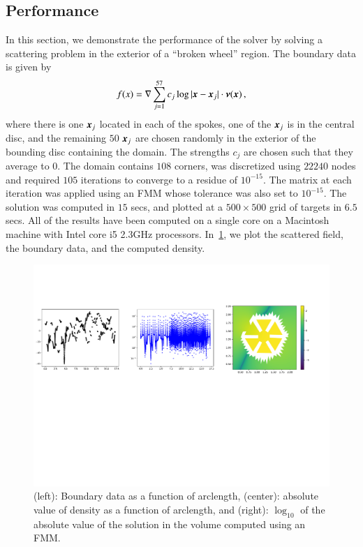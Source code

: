 \subsection{Performance}
In this section, we demonstrate the performance of the solver by solving a scattering problem in the
exterior of a ``broken wheel'' region. The boundary data is given by
\begin{equation}
f(x) = \nabla  \sum_{j=1}^{57} c_{j} \log| \boldsymbol{x} - \boldsymbol{x}_{j}| \cdot \boldsymbol{\nu}(\boldsymbol{x}) \, , 
\end{equation}
where there is one $\boldsymbol{x}_{j}$ located in each of the spokes, one of the $\boldsymbol{x}_{j}$ is in the central disc, and the remaining $50$ $\boldsymbol{x}_{j}$ are chosen randomly in the exterior of the bounding disc containing the domain. The strengths $c_{j}$ are chosen such that they average to $0$. The domain contains $108$ corners, was discretized using $22240$ nodes and required $105$ iterations  to converge to a residue of $10^{-15}$. The matrix at each iteration was applied using an FMM whose tolerance was also set to $10^{-15}$. The solution was computed in $15$ secs, and plotted at a $500\times 500$ grid of targets in $6.5$ secs. All of the results have been computed on a single core on a Macintosh machine with Intel core i5 2.3GHz processors. In~\cref{fig:magnetron}, we plot the scattered field, the boundary data, and the computed density.


\begin{figure}
\begin{center}
\includegraphics[width=\linewidth]{paper-figs/magnetron}
\caption{(left): Boundary data as a function of arclength, (center): absolute value of density as a function of arclength, and 
(right): $\log_{10}$ of the absolute value of the solution in the volume computed using an FMM.}
\label{fig:magnetron}
\end{center}
\end{figure}

